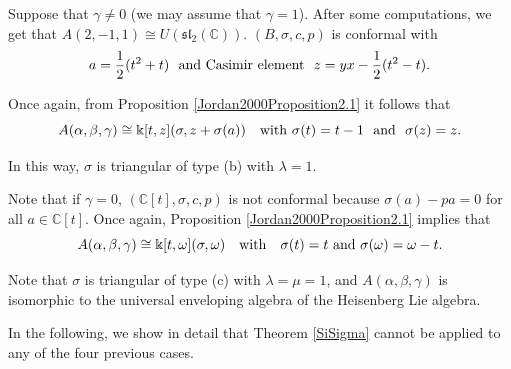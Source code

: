 \documentclass{amsart}
\theoremstyle{definition}
\theoremstyle{remark}
\numberwithin{equation}{section}
\begin{document}
\begin{itemize}
Suppose that $\gamma \neq 0$ (we may assume that $\gamma = 1$). After some computations, we get that $A(2, -1, 1) \cong U(\mathfrak{sl}_2(\mathbb{C}))$. $(B, \sigma, c, p)$ is conformal with 
$$
a = \frac{1}{2}(t^2 + t) \ \ {\rm and \ Casimir \ element} \ \ z = yx - \frac{1}{2} (t^2 - t).
$$

Once again, from Proposition \ref{Jordan2000Proposition2.1} it follows that
\begin{equation}
A(\alpha, \beta, \gamma) \cong \Bbbk[t, z] (\sigma, z + \sigma(a)) \quad {\rm with} \, \, \sigma(t) = t - 1 \ \ {\rm and} \ \ \sigma(z) = z.
\end{equation}

In this way, $\sigma$ is triangular of type (b) with $\lambda = 1$.

Note that if $\gamma = 0$, $(\mathbb{C}[t], \sigma, c, p)$ is not conformal because $\sigma(a) - pa = 0$ for all $a\in \mathbb{C}[t]$. Once again, Proposition \ref{Jordan2000Proposition2.1} implies that
$$
A(\alpha, \beta, \gamma) \cong \Bbbk[t, \omega](\sigma, \omega) \quad {\rm with} \quad \sigma (t) = t \, \, {\rm and} \, \,  \sigma(\omega) = \omega - t.
$$

Note that $\sigma$ is triangular of type (c) with $\lambda = \mu  = 1$, and $A(\alpha, \beta, \gamma)$ is isomorphic to the universal enveloping algebra of the Heisenberg Lie algebra.
\end{itemize}

In the following, we show in detail that Theorem \ref{SiSigma} cannot be applied to any of the four previous cases.
\end{document}
